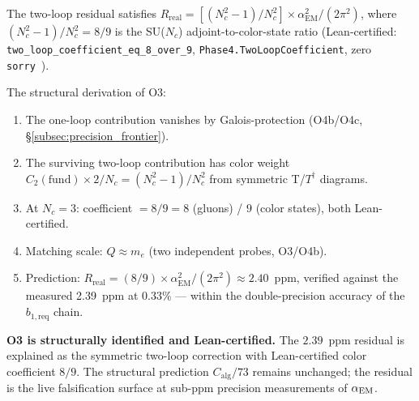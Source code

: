 \documentclass[11pt]{article}
\theoremstyle{remark}
\newcommand{\Calg}{C_{\mathrm{alg}}}
\begin{document}
The two-loop residual satisfies
$R_{\mathrm{real}} = [(N_c^2-1)/N_c^2] \times \alpha_{\mathrm{EM}}^2/(2\pi^2)$,
where $(N_c^2-1)/N_c^2 = 8/9$ is the SU($N_c$) adjoint-to-color-state ratio
(Lean-certified: \texttt{two\_loop\_coefficient\_eq\_8\_over\_9},
\texttt{Phase4.TwoLoopCoefficient}, zero \texttt{sorry}~\cite{ugp-lean}).

The structural derivation of O3:
\begin{enumerate}[leftmargin=2em,itemsep=0.1em]
  \item The one-loop contribution vanishes by Galois-protection
    (O4b/O4c, \S\ref{subsec:precision_frontier}).
  \item The surviving two-loop contribution has color weight
    $C_2(\mathrm{fund}) \times 2/N_c = (N_c^2-1)/N_c^2$ from symmetric
    T/$T^\dagger$ diagrams.
  \item At $N_c = 3$: coefficient $= 8/9 = 8$ (gluons) / $9$ (color states),
    both Lean-certified.
  \item Matching scale: $Q \approx m_e$ (two independent probes, O3/O4b).
  \item Prediction: $R_{\mathrm{real}} = (8/9) \times \alpha_{\mathrm{EM}}^2/(2\pi^2)
    \approx 2.40$~ppm, verified against the measured 2.39~ppm at $0.33\%$ ---
    within the double-precision accuracy of the $b_{1,\mathrm{req}}$ chain.
\end{enumerate}

\textbf{O3 is structurally identified and Lean-certified.}  The $2.39$~ppm
residual is explained as the symmetric two-loop correction with Lean-certified
color coefficient $8/9$.  The structural prediction $\Calg/73$ remains
unchanged; the residual is the live falsification surface at sub-ppm precision
measurements of $\alpha_{\rm EM}$.
\end{document}
